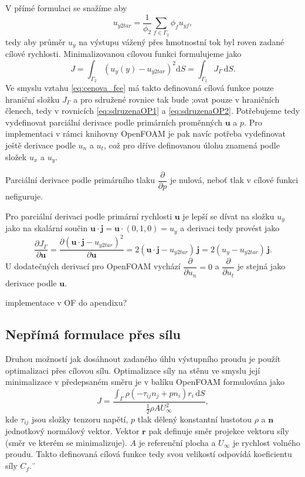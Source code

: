 V přímé formulaci se snažíme aby
\begin{equation}
	u_{y2tar}=\dfrac{1}{\phi_2}\sum_{f\in\Gamma_2}\phi_f u_{yf},
\end{equation}
tedy aby průměr $ u_y $ na výstupu vážený přes hmotnostní tok byl roven zadané cílové rychlosti.
Minimalizovanou cílovou funkci formulujeme jako
\begin{equation}
	J = \int_{\Gamma_2}\left( u_y(y)-u_{y2tar} \right)^2\mathrm{d}S = \int_{\Gamma_2} J_\Gamma\, \mathrm{d}S.
\end{equation}
Ve smyslu vztahu \ref{eq:cenova_fce} má takto definovaná cílová funkce pouze hraniční složku $ J_\Gamma $ a pro sdružené rovnice tak bude ;ovat pouze v hraničních členech, tedy v rovnicích \ref{eq:sdruzenaOP1} a \ref{eq:sdruzenaOP2}. Potřebujeme tedy vydefinovat parciální derivace podle primárních proměnných $ \mathbf{u} $ a $ p $. Pro implementaci v rámci knihovny OpenFOAM je pak navíc potřeba vydefinovat ještě derivace podle $ u_n $ a $ u_t $, což pro dříve definovanou úlohu znamená podle složek $ u_x $ a $ u_y $.

Parciální derivace podle primárního tlaku $ \dfrac{\partial}{\partial p} $ je nulová, neboť tlak v cílové funkci nefiguruje.

Pro parciální derivaci podle primární rychlosti $ \mathbf{u} $ je lepší se dívat na složku $ u_y $ jako na skalární součin $ \mathbf{u}\cdot \mathbf{j}=\mathbf{u}\cdot (0,1,0) = u_y$ a derivaci tedy provést jako
\begin{equation}\label{key}
\dfrac{\partial J_\Gamma}{\partial \mathbf{u}}
=
\dfrac{\partial \left( \mathbf{u}\cdot \mathbf{j}-u_{y2tar} \right)^2}{\partial \mathbf{u}}
=
2( \mathbf{u}\cdot \mathbf{j}-u_{y2tar} )\,\mathbf{j}
=
2( u_y-u_{y2tar} )\,\mathbf{j}.
\end{equation}
U dodatečných derivací pro OpenFOAM vychází $ \dfrac{\partial}{\partial u_n}=0 $ a $ \dfrac{\partial }{\partial u_t} $ je stejná jako derivace podle $ \mathbf{u} $.

implementace v OF do apendixu?

\subsection{Nepřímá formulace přes sílu}

Druhou možností jak dosáhnout zadaného úhlu výstupního proudu je použít optimalizaci přes cílovou sílu. 
Optimalizace síly na stěnu ve smyslu její minimalizace v předepsaném směru je v balíku OpenFOAM formulována jako
\begin{equation}\label{key}
J=\dfrac{\int_\Gamma \rho (-\tau_{ij}n_j+pn_i)r_i\,\mathrm{d}S}{\frac{1}{2}\rho A U_{\infty}^2},
\end{equation}
kde $ \tau_{ij} $ jsou složky tenzoru napětí, $ p $ tlak dělený konstantní hustotou $ \rho $ a $ \mathbf{n} $ jednotkový normálový vektor. Vektor $ \mathbf{r} $ pak definuje směr projekce vektoru síly (směr ve kterém se minimalizuje). $ A $ je referenční plocha a $ U_{\infty} $ je rychlost volného proudu. Takto definovaná cílová funkce tedy svou velikostí odpovídá koeficientu síly $ C_f $.¨

